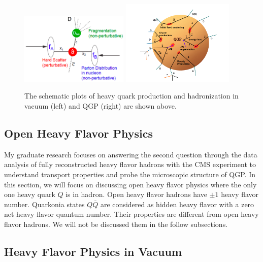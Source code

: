  \begin{figure}[hbtp]
\begin{center}
\includegraphics[width=0.46\textwidth]{Figures/Chapter1/HQVacuum.png}
\includegraphics[width=0.48\textwidth]{Figures/Chapter1/HQQGP.png}
\caption{The schematic plots of heavy quark production and hadronization in vacuum (left) and QGP (right) are shown above.}
\label{HQ}
\end{center}
\end{figure}   


\subsection{Open Heavy Flavor Physics}

My graduate research focuses on answering the second question through the data analysis of fully reconstructed heavy flavor hadrons with the CMS experiment to understand transport properties and probe the microscopic structure of QGP. In this section, we will focus on discussing open heavy flavor physics where the only one heavy quark $Q$ is in hadron. Open heavy flavor hadrons have $\pm 1$ heavy flavor number. Quarkonia states $Q\bar Q$ are considered as hidden heavy flavor with a zero net heavy flavor quantum number. Their properties are different from open heavy flavor hadrons. We will not be discussed them in the follow subsections. 

\subsection{Heavy Flavor Physics in Vacuum}

